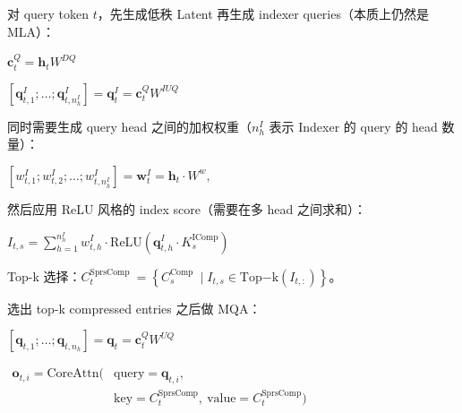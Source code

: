\documentclass[zihao=false,fontset=windows]{ctexart}
\newcommand{\bigmath}[1]{%
  \begin{center}\large$\displaystyle #1$\end{center}%
}
\begin{document}
对 query token $t$，先生成低秩 Latent 再生成 indexer queries（本质上仍然是 MLA）：\par

\bigmath{\mathbf c_t^Q=\mathbf h_tW^{DQ}}

\bigmath{[\mathbf q_{t,1}^I;\ldots;\mathbf q_{t,n_h^I}^I]=\mathbf q_t^I=\mathbf c_t^QW^{IUQ}}

同时需要生成 query head 之间的加权权重（$n_h^I$ 表示 Indexer 的 query 的 head 数量）：\par

\bigmath{[w_{t,1}^I;w_{t,2}^I;\ldots;w_{t,n_h^I}^I]=\mathbf w_t^I=\mathbf h_t\cdot W^w,}

然后应用 ReLU 风格的 index score（需要在多 head 之间求和）：\par

\bigmath{I_{t,s}=\sum_{h=1}^{n_h^I}w_{t,h}^I\cdot\mathrm{ReLU}(\mathbf q_{t,h}^I\cdot K_s^{\mathrm{IComp}})}

Top-k 选择：$C_t^{\text{SprsComp }}=\left\{C_s^{\text{Comp }}\mid I_{t,s}\in\mathrm{Top}\mathord{-}\mathrm{k}(I_{t,:})\right\}$。\par

\par{}\vspace{0.8em}\par\vspace{0.28em}

选出 top-k compressed entries 之后做 MQA：\par

\bigmath{[\mathbf q_{t,1};\ldots;\mathbf q_{t,n_h}]=\mathbf q_t=\mathbf c_t^QW^{UQ}}

\bigmath{\begin{aligned}\mathbf o_{t,i}=\mathrm{CoreAttn}(&\mathrm{query}=\mathbf q_{t,i},\\ &\mathrm{key}=C_t^{\mathrm{SprsComp}},\ \mathrm{value}=C_t^{\mathrm{SprsComp}})\end{aligned}}
\end{document}
